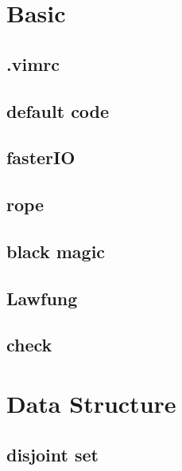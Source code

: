 \documentclass[a4paper,10pt,twocolumn,oneside]{article}
\begin{document}
\pagestyle{fancy}
\fancyfoot{}
\fancyhead[R]{\thepage}
\renewcommand{\headrulewidth}{0.4pt}
\renewcommand{\contentsname}{Contents} 

\scriptsize
\tableofcontents

\newpage

\section{Basic}
\subsection{.vimrc}


\subsection{default code}


\subsection{fasterIO}


\subsection{rope}


\subsection{black magic}


\subsection{Lawfung}


\subsection{check}


\section{Data Structure}
\subsection{disjoint set}

\end{document}
